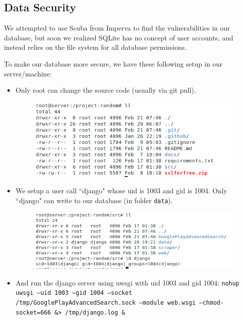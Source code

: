 \documentclass[12pt, a4paper]{article}
\newcommand{\code}[1]{\texttt{#1}}
\begin{document}
\subsection{Data Security}
We attempted to use Scuba from Imperva to find the vulnerabilities in our database, but soon we realized SQLite has no concept of user accounts, and instead relies on the file system for all database permissions.

To make our database more secure, we have these following setup in our server/machine:

\begin{itemize}
    \item Only root can change the source code (usually via git pull).
    \begin{figure}[H]
    \centering
    \includegraphics[width=\textwidth, frame]{sourcecodeper.png}
    \end{figure}
    \item We setup a user call ``django" whose uid is 1003 and gid is 1004. Only ``django" can write to our database (in folder \code{data}).
    \begin{figure}[H]
    \centering
    \includegraphics[width=\textwidth, frame]{databaseper.png}
    \end{figure}
    \item And run the django server using uwsgi with uid 1003 and gid 1004: \code{nohup uwsgi --uid 1003 --gid 1004 --socket \linebreak[4] /tmp/GooglePlayAdvancedSearch.sock --module web.wsgi \linebreak[4] --chmod-socket=666 \&> /tmp/django.log \&}
\end{itemize}
\end{document}
